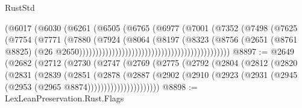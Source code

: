 \begin{lexlean}{RustStd}
\begin{coremodule}
                                                        (@6017
                                                          (@6030
                                                            (@6261
                                                              (@6505
                                                                (@6765
                                                                  (@6977
                                                                    (@7001
                                                                      (@7352
                                                                        (@7498
                                                                          (@7625
                                                                            (@7754
                                                                              (@7771
                                                                                (@7880
                                                                                  (@7924
                                                                                    (@8064
                                                                                      (@8197
                                                                                        (@8323
                                                                                          (@8756
                                                                                            (@2651
                                                                                              (@8761
                                                                                                @8825)
                                                                                              (@26
                                                                                                @2650))))))))))))))))))))))))))))))))))))))))))))))
@8897 := @2649
    (@2682
      (@2712
        (@2730
          (@2747
            (@2769
              (@2775
                (@2792
                  (@2804
                    (@2812
                      (@2820
                        (@2831
                          (@2839
                            (@2851
                              (@2878
                                (@2887
                                  (@2902
                                    (@2910
                                      (@2923 (@2931 (@2945 (@2953 (@2965 @8874))))))))))))))))))))))
@8898 := LexLeanPreservation.Rust.Flags

\end{coremodule}
\end{lexlean}
